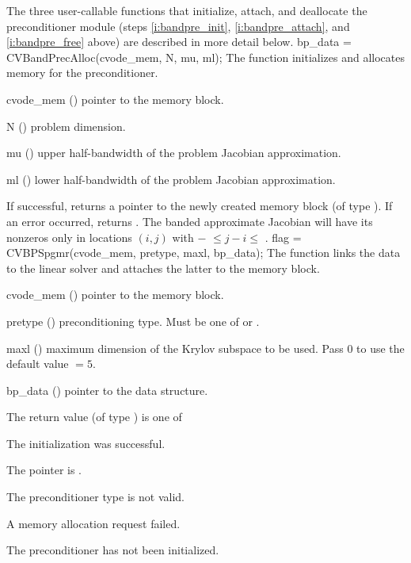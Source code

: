 The three user-callable functions that initialize, attach, and deallocate
the {\cvbandpre} preconditioner module (steps \ref{i:bandpre_init},
\ref{i:bandpre_attach}, and \ref{i:bandpre_free} above) are described
in more detail below.
{
  bp\_data = CVBandPrecAlloc(cvode\_mem, N, mu, ml);
}
{
  The function  initializes and allocates
  memory for the {\cvbandpre} preconditioner.
}
{
  \begin{args}
  \item[cvode\_mem] ()
    pointer to the {\cvode} memory block.
  \item[N] ()
    problem dimension.
  \item[mu] ()
    upper half-bandwidth of the problem Jacobian approximation.
  \item[ml] ()
    lower half-bandwidth of the problem Jacobian approximation.
  \end{args}
}
{
  If successful,  returns a pointer to the newly created 
  {\cvbandpre} memory block (of type ).
  If an error occurred,  returns .
}
{
  The banded approximate Jacobian will have its nonzeros only in locations
  $(i,j)$ with $-$ $\leq j-i \leq$ .
}
{
  flag = CVBPSpgmr(cvode\_mem, pretype, maxl, bp\_data);
}
{
  The function  links the {\cvbandpre} data to the
  {\cvspgmr} linear solver and attaches the latter to the {\cvode}
  memory block.
}
{
  \begin{args}
  \item[cvode\_mem] ()
    pointer to the {\cvode} memory block.
  \item[pretype] ()
    preconditioning type. Must be one of  or .
  \item[maxl] ()
    maximum dimension of the Krylov subspace to be used. Pass $0$ to use the 
    default value $=5$.
  \item[bp\_data] ()
    pointer to the {\cvbandpre} data structure.
  \end{args}
}
{
  The return value  (of type ) is one of
  \begin{args}
  \item[\Id{CVSPGMR\_SUCCESS}] 
    The {\cvspgmr} initialization was successful.
  \item[\Id{CVSPGMR\_MEM\_NULL}]
    The  pointer is .
  \item[\Id{CVSPGMR\_ILL\_INPUT}]
    The preconditioner type  is not valid.
  \item[\Id{CVSPGMR\_MEM\_FAIL}]
    A memory allocation request failed.
  \item[\Id{CV\_PDATA\_NULL}]
    The {\cvbandpre} preconditioner has not been initialized.
  \end{args}
}
